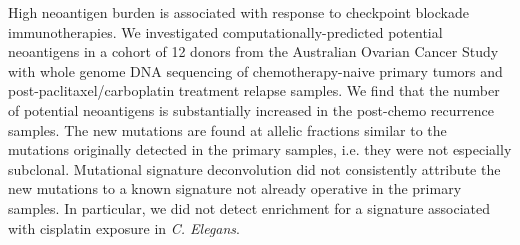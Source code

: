 High neoantigen burden is associated with response to checkpoint blockade immunotherapies. We investigated computationally-predicted potential neoantigens in a cohort of 12 donors from the Australian Ovarian Cancer Study with whole genome DNA sequencing of chemotherapy-naive primary tumors and post-paclitaxel/carboplatin treatment relapse samples. We find that the number of potential neoantigens is substantially increased in the post-chemo recurrence samples. The new mutations are found at allelic fractions similar to the mutations originally detected in the primary samples, i.e. they were not especially subclonal. Mutational signature deconvolution did not consistently attribute the new mutations to a known signature not already operative in the primary samples. In particular, we did not detect enrichment for a signature associated with cisplatin exposure in \textit{C. Elegans}.

